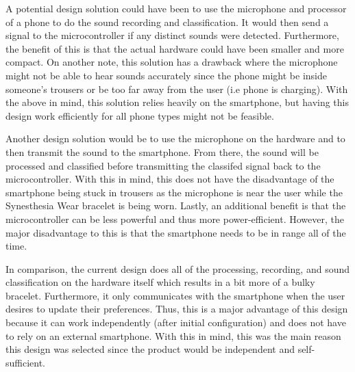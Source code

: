 \documentclass[12pt, titlepage]{article}
\begin{document}
\begin{appendices}
\begin{enumerate}
    A potential design solution could have been to use the microphone and processor of a phone to do the sound recording and classification. It would then send a signal to the microcontroller if any distinct sounds were detected. Furthermore, the benefit of this is that the actual hardware could have been smaller and more compact. On another note, this solution has a drawback where the microphone might not be able to hear sounds accurately since the phone might be inside someone's trousers or be too far away from the user (i.e phone is charging). With the above in mind, this solution relies heavily on the smartphone, but having this design work efficiently for all phone types might not be feasible. 

    Another design solution would be to use the microphone on the hardware and to then transmit the sound to the smartphone. From there, the sound will be processed and classified before transmitting the classifed signal back to the microcontroller. With this in mind, this does not have the disadvantage of the smartphone being stuck in trousers as the microphone is near the user while the Synesthesia Wear bracelet is being worn. Lastly, an additional benefit is that the microcontroller can be less powerful and thus more power-efficient. However, the major disadvantage to this is that the smartphone needs to be in range all of the time.    

    In comparison, the current design does all of the processing, recording, and sound classification on the hardware itself which results in a bit more of a bulky bracelet. Furthermore, it only communicates with the smartphone when the user desires to update their preferences. Thus, this is a major advantage of this design because it can work independently (after initial configuration) and does not have to rely on an external smartphone. With this in mind, this was the main reason this design was selected since the product would be independent and self-sufficient.
  \end{enumerate}
  
  \end{appendices}
\end{document}
